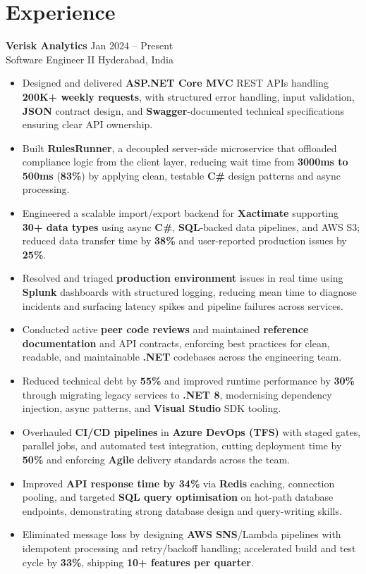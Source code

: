 \documentclass[10pt,letterpaper]{article}
\newcommand{\resumeSubheading}[4]{%
  \textbf{#1} \hfill #2 \\
  #3 \hfill #4 \\
}
\begin{document}
\section*{Experience}
\resumeSubheading{Verisk Analytics}{Jan 2024 -- Present}{Software Engineer II}{Hyderabad, India}
\begin{itemize}
    \item Designed and delivered \textbf{ASP.NET Core MVC} REST APIs handling \textbf{200K+ weekly requests}, with structured error handling, input validation, \textbf{JSON} contract design, and \textbf{Swagger}-documented technical specifications ensuring clear API ownership.
    \item Built \textbf{RulesRunner}, a decoupled server-side microservice that offloaded compliance logic from the client layer, reducing wait time from \textbf{3000ms to 500ms} (\textbf{83\%}) by applying clean, testable \textbf{C\#} design patterns and async processing.
    \item Engineered a scalable import/export backend for \textbf{Xactimate} supporting \textbf{30+ data types} using async \textbf{C\#}, \textbf{SQL}-backed data pipelines, and AWS S3; reduced data transfer time by \textbf{38\%} and user-reported production issues by \textbf{25\%}.
    \item Resolved and triaged \textbf{production environment} issues in real time using \textbf{Splunk} dashboards with structured logging, reducing mean time to diagnose incidents and surfacing latency spikes and pipeline failures across services.
    \item Conducted active \textbf{peer code reviews} and maintained \textbf{reference documentation} and API contracts, enforcing best practices for clean, readable, and maintainable \textbf{.NET} codebases across the engineering team.
    \item Reduced technical debt by \textbf{55\%} and improved runtime performance by \textbf{30\%} through migrating legacy services to \textbf{.NET 8}, modernising dependency injection, async patterns, and \textbf{Visual Studio} SDK tooling.
    \item Overhauled \textbf{CI/CD pipelines} in \textbf{Azure DevOps (TFS)} with staged gates, parallel jobs, and automated test integration, cutting deployment time by \textbf{50\%} and enforcing \textbf{Agile} delivery standards across the team.
    \item Improved \textbf{API response time by 34\%} via \textbf{Redis} caching, connection pooling, and targeted \textbf{SQL query optimisation} on hot-path database endpoints, demonstrating strong database design and query-writing skills.
    \item Eliminated message loss by designing \textbf{AWS SNS}/Lambda pipelines with idempotent processing and retry/backoff handling; accelerated build and test cycle by \textbf{33\%}, shipping \textbf{10+ features per quarter}.
\end{itemize}
\end{document}
